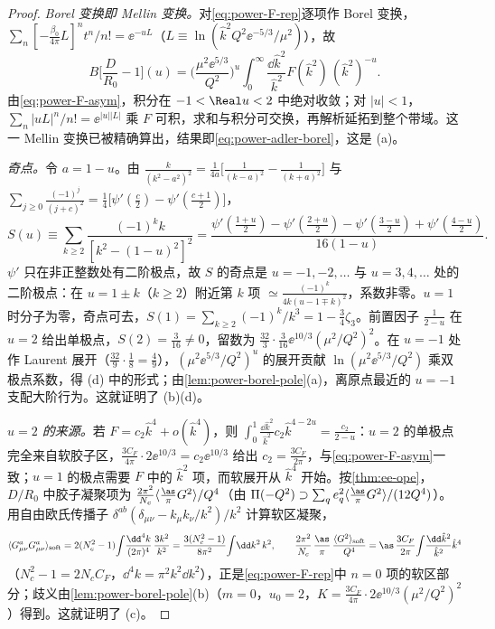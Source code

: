 \begin{proof}
\emph{Borel 变换即 Mellin 变换。}对\eqref{eq:power-F-rep}逐项作 Borel 变换，$\sum_n[-\frac{\beta_0}{4\pi}L]^nt^n/n!=\ee^{-uL}$（$L\equiv\ln(\hat k^2Q^2\ee^{-5/3}/\mu^2)$），故
\begin{equation}\label{eq:power-mellin}
B\Big[\frac{D}{R_0}-1\Big](u)=\Big(\frac{\mu^2\ee^{5/3}}{Q^2}\Big)^u\int_0^\infty\frac{\dd\hat k^2}{\hat k^2}F(\hat k^2)\,(\hat k^2)^{-u}.
\end{equation}
由\eqref{eq:power-F-asym}，积分在 $-1<\Real u<2$ 中绝对收敛；对 $|u|<1$，$\sum_n|uL|^n/n!=\ee^{|u||L|}$ 乘 $F$ 可积，求和与积分可交换，再解析延拓到整个带域。这一 Mellin 变换已被精确算出，结果即\eqref{eq:power-adler-borel}\cite{Beneke1993,Broadhurst1993,Beneke1999}，这是 (a)。

\emph{奇点。}令 $a=1-u$。由 $\frac{k}{(k^2-a^2)^2}=\frac1{4a}\big[\frac{1}{(k-a)^2}-\frac{1}{(k+a)^2}\big]$ 与 $\sum_{j\ge0}\frac{(-1)^j}{(j+c)^2}=\frac14\big[\psi'(\frac c2)-\psi'(\frac{c+1}2)\big]$，
\begin{equation}\label{eq:power-S-trigamma}
S(u)\equiv\sum_{k\ge2}\frac{(-1)^kk}{[k^2-(1-u)^2]^2}=\frac{\psi'(\frac{1+u}2)-\psi'(\frac{2+u}2)-\psi'(\frac{3-u}2)+\psi'(\frac{4-u}2)}{16(1-u)}.
\end{equation}
$\psi'$ 只在非正整数处有二阶极点，故 $S$ 的奇点是 $u=-1,-2,\dots$ 与 $u=3,4,\dots$ 处的二阶极点：在 $u=1\pm k$（$k\ge2$）附近第 $k$ 项 $\simeq\frac{(-1)^k}{4k(u-1\mp k)^2}$，系数非零。$u=1$ 时分子为零，奇点可去，$S(1)=\sum_{k\ge2}(-1)^k/k^3=1-\frac34\zeta_3$。前置因子 $\frac{1}{2-u}$ 在 $u=2$ 给出单极点，$S(2)=\frac3{16}\ne0$，留数为 $\frac{32}{3}\cdot\frac{3}{16}\ee^{10/3}(\mu^2/Q^2)^2$。在 $u=-1$ 处作 Laurent 展开（$\frac{32}{9}\cdot\frac18=\frac49$），$(\mu^2\ee^{5/3}/Q^2)^u$ 的展开贡献 $\ln(\mu^2\ee^{5/3}/Q^2)$ 乘双极点系数，得 (d) 中的形式；由\cref{lem:power-borel-pole}(a)，离原点最近的 $u=-1$ 支配大阶行为。这就证明了 (b)(d)。

\emph{$u=2$ 的来源。}若 $F=c_2\hat k^4+o(\hat k^4)$，则 $\int_0^1\frac{\dd\hat k^2}{\hat k^2}c_2\hat k^{4-2u}=\frac{c_2}{2-u}$：$u=2$ 的单极点完全来自软胶子区，$\frac{3C_F}{4\pi}\cdot2\ee^{10/3}=c_2\ee^{10/3}$ 给出 $c_2=\frac{3C_F}{2\pi}$，与\eqref{eq:power-F-asym}一致；$u=1$ 的极点需要 $F$ 中的 $\hat k^2$ 项，而软展开从 $\hat k^4$ 开始。按\cref{thm:ee-ope}，$D/R_0$ 中胶子凝聚项为 $\frac{2\pi^2}{N_c}\langle\frac{\as}{\pi}G^2\rangle/Q^4$（由 $\Pi(-Q^2)\supset\sum_qe_q^2\langle\frac{\as}{\pi}G^2\rangle/(12Q^4)$）。用自由欧氏传播子 $\delta^{ab}(\delta_{\mu\nu}-k_\mu k_\nu/k^2)/k^2$ 计算软区凝聚，
\begin{equation}\label{eq:power-soft-condensate}
\langle G^a_{\mu\nu}G^a_{\mu\nu}\rangle_{\mathrm{soft}}=2(N_c^2-1)\!\int\!\frac{\dd^4k}{(2\pi)^4}\,\frac{3k^2}{k^2}=\frac{3(N_c^2-1)}{8\pi^2}\!\int\!\dd k^2\,k^2,
\qquad
\frac{2\pi^2}{N_c}\,\frac{\as}{\pi}\,\frac{\langle G^2\rangle_{\mathrm{soft}}}{Q^4}=\as\,\frac{3C_F}{2\pi}\!\int\!\frac{\dd\hat k^2}{\hat k^2}\hat k^4
\end{equation}
（$N_c^2-1=2N_cC_F$，$\dd^4k=\pi^2k^2\dd k^2$），正是\eqref{eq:power-F-rep}中 $n=0$ 项的软区部分；歧义由\cref{lem:power-borel-pole}(b)（$m=0$，$u_0=2$，$K=\frac{3C_F}{4\pi}\cdot2\ee^{10/3}(\mu^2/Q^2)^2$）得到。这就证明了 (c)。
\end{proof}

